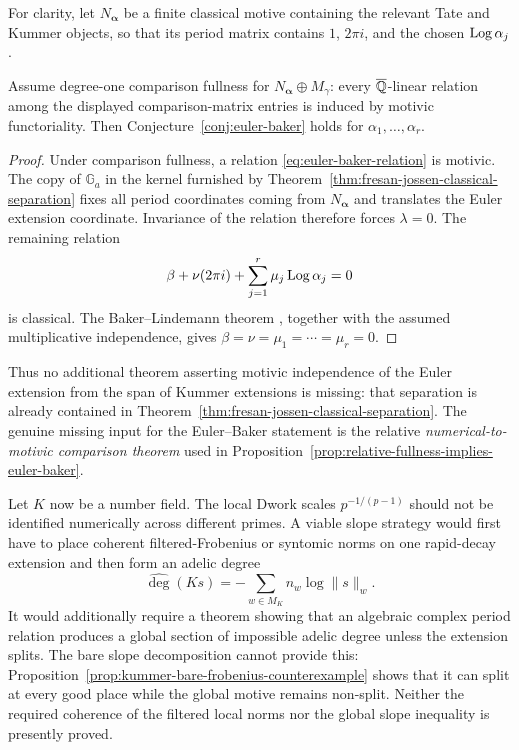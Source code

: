 For clarity, let $N_{\boldsymbol\alpha}$ be a finite classical motive
containing the relevant Tate and Kummer objects, so that its period matrix
contains $1$, $2\pi i$, and the chosen $\operatorname{Log}\alpha_j$.

\begin{proposition}
\label{prop:relative-fullness-implies-euler-baker}
Assume degree-one comparison fullness for
$N_{\boldsymbol\alpha}\oplus M_\gamma$: every $\overline{\mathbb Q}$-linear relation among
the displayed comparison-matrix entries is induced by motivic
functoriality.  Then Conjecture~\ref{conj:euler-baker} holds for
$\alpha_1,\ldots,\alpha_r$.
\end{proposition}

\begin{proof}
Under comparison fullness, a relation
\eqref{eq:euler-baker-relation} is motivic.  The copy of $\mathbb G_a$ in
the kernel furnished by
Theorem~\ref{thm:fresan-jossen-classical-separation} fixes all period
coordinates coming from $N_{\boldsymbol\alpha}$ and translates the Euler
extension coordinate.  Invariance of the relation therefore forces
$\lambda=0$.  The remaining relation
\[
 \beta+\nu(2\pi i)+\sum_{j=1}^r\mu_j\operatorname{Log}\alpha_j=0
\]
is classical.  The Baker--Lindemann theorem \cite{Baker1975}, together with the assumed
multiplicative independence, gives
$\beta=\nu=\mu_1=\cdots=\mu_r=0$.
\end{proof}

Thus no additional theorem asserting motivic independence of the Euler
extension from the span of Kummer extensions is missing: that separation is
already contained in
Theorem~\ref{thm:fresan-jossen-classical-separation}.  The genuine missing
input for the Euler--Baker statement is the relative
\emph{numerical-to-motivic comparison theorem} used in
Proposition~\ref{prop:relative-fullness-implies-euler-baker}.

\begin{remark}
Let $K$ now be a number field.  The local Dwork scales
$p^{-1/(p-1)}$ should not be identified numerically across different
primes.  A viable slope strategy would first have to place coherent
filtered-Frobenius or syntomic norms on one rapid-decay extension and then
form an adelic degree
\[
 \widehat{\deg}(Ks)=-\sum_{w\in M_K}n_w\log\|s\|_w.
\]
It would additionally require a theorem showing that an algebraic complex
period relation produces a global section of impossible adelic degree
unless the extension splits.  The bare slope decomposition cannot provide
this: Proposition~\ref{prop:kummer-bare-frobenius-counterexample} shows
that it can split at every good place while the global motive remains
non-split.  Neither the required coherence of the filtered local norms nor
the global slope inequality is presently proved.
\end{remark}

